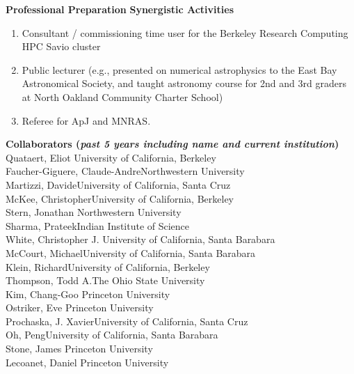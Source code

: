 \documentclass[11pt,letterpaper,english]{article}
\begin{document}
\begin{flushleft} {\bf Professional Preparation}
\vspace{.04in}
{\bf Synergistic Activities}
\vspace{-6pt}
\begin{enumerate} \itemsep1pt \parskip0pt 
\item Consultant / commissioning time user for the Berkeley Research Computing HPC Savio cluster
\item Public lecturer (e.g., presented on numerical astrophysics to the East Bay Astronomical Society, and taught astronomy course for 2nd and 3rd graders at North Oakland Community Charter School) \\
\item Referee for ApJ and MNRAS. \\
\end{enumerate} 

\vspace{-6pt}
{\bf Collaborators ({\emph{past 5 years including name and current institution}})} \\
{\parindent 16pt
Quataert, Eliot \hfill University of California, Berkeley \\
Faucher-Giguere, Claude-Andre\hfill Northwestern University \\
Martizzi, Davide\hfill University of California, Santa Cruz \\
McKee, Christopher\hfill University of California, Berkeley \\
Stern, Jonathan \hfill Northwestern University \\
Sharma, Prateek\hfill Indian Institute of Science \\
White, Christopher J. \hfill University of California, Santa Barabara \\
McCourt, Michael\hfill University of California, Santa Barabara \\
Klein, Richard\hfill University of California, Berkeley \\
Thompson, Todd A.\hfill The Ohio State University \\
Kim, Chang-Goo \hfill Princeton University \\
Ostriker, Eve \hfill Princeton University \\
Prochaska, J. Xavier\hfill University of California, Santa Cruz \\
Oh, Peng\hfill University of California, Santa Barabara \\
Stone, James \hfill Princeton University \\
Lecoanet, Daniel \hfill Princeton University \\
}


\end{flushleft}
\end{document}
